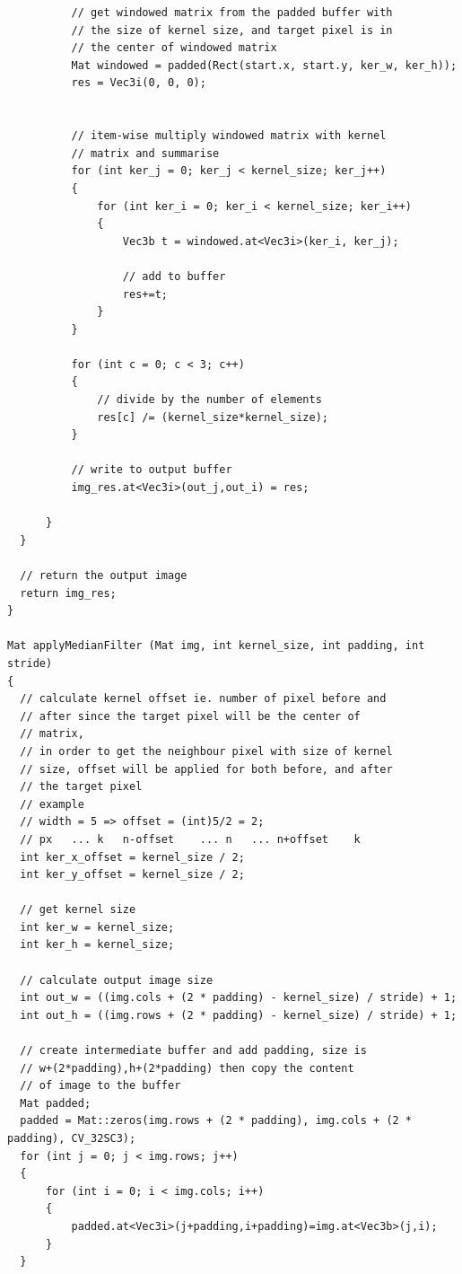 \documentclass[12pt,a4paper]{report}
\begin{document}
\begin{lstlisting}
          // get windowed matrix from the padded buffer with 
          // the size of kernel size, and target pixel is in
          // the center of windowed matrix
          Mat windowed = padded(Rect(start.x, start.y, ker_w, ker_h));
          res = Vec3i(0, 0, 0);


          // item-wise multiply windowed matrix with kernel 
          // matrix and summarise 
          for (int ker_j = 0; ker_j < kernel_size; ker_j++)
          {
              for (int ker_i = 0; ker_i < kernel_size; ker_i++)
              {
                  Vec3b t = windowed.at<Vec3i>(ker_i, ker_j);
                  
                  // add to buffer
                  res+=t;
              }
          }

          for (int c = 0; c < 3; c++)
          {
              // divide by the number of elements
              res[c] /= (kernel_size*kernel_size);
          }

          // write to output buffer
          img_res.at<Vec3i>(out_j,out_i) = res;
          
      }
  }

  // return the output image
  return img_res;
}

Mat applyMedianFilter (Mat img, int kernel_size, int padding, int stride)
{
  // calculate kernel offset ie. number of pixel before and 
  // after since the target pixel will be the center of 
  // matrix,
  // in order to get the neighbour pixel with size of kernel
  // size, offset will be applied for both before, and after
  // the target pixel
  // example
  // width = 5 => offset = (int)5/2 = 2;
  // px   ... k   n-offset    ... n   ... n+offset    k
  int ker_x_offset = kernel_size / 2;
  int ker_y_offset = kernel_size / 2;

  // get kernel size
  int ker_w = kernel_size;
  int ker_h = kernel_size;

  // calculate output image size
  int out_w = ((img.cols + (2 * padding) - kernel_size) / stride) + 1;
  int out_h = ((img.rows + (2 * padding) - kernel_size) / stride) + 1;

  // create intermediate buffer and add padding, size is 
  // w+(2*padding),h+(2*padding) then copy the content 
  // of image to the buffer
  Mat padded;
  padded = Mat::zeros(img.rows + (2 * padding), img.cols + (2 * padding), CV_32SC3);
  for (int j = 0; j < img.rows; j++)
  {
      for (int i = 0; i < img.cols; i++)
      {
          padded.at<Vec3i>(j+padding,i+padding)=img.at<Vec3b>(j,i);
      }
  }
  

\end{lstlisting}
\end{document}

